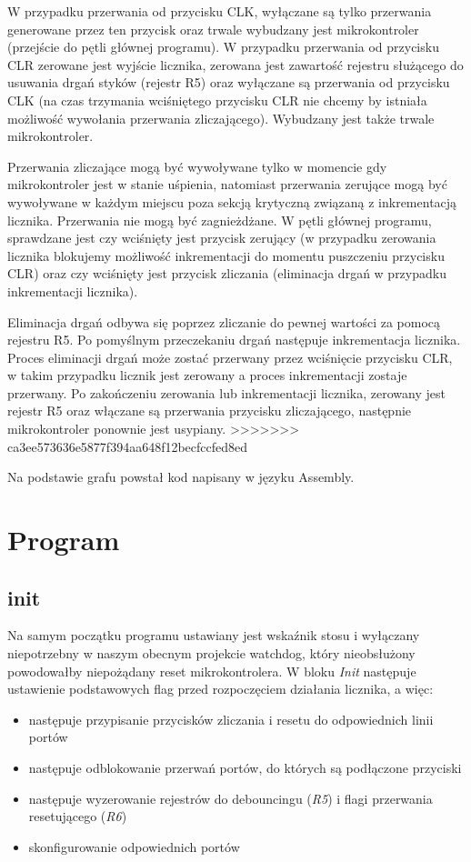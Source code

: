 \documentclass[fleqn]{article}
\begin{document}
W przypadku przerwania od przycisku CLK, wyłączane są tylko przerwania generowane przez ten przycisk oraz trwale wybudzany jest mikrokontroler (przejście do pętli głównej programu). W przypadku przerwania od przycisku CLR zerowane jest wyjście licznika, zerowana jest zawartość rejestru służącego do usuwania drgań styków (rejestr R5) oraz wyłączane są przerwania od przycisku CLK (na czas trzymania wciśniętego przycisku CLR nie chcemy by istniała możliwość wywołania przerwania zliczającego). Wybudzany jest także trwale mikrokontroler.

Przerwania zliczające mogą być wywoływane tylko w momencie gdy mikrokontroler jest w stanie uśpienia, natomiast przerwania zerujące mogą być wywoływane w każdym miejscu poza sekcją krytyczną związaną z inkrementacją licznika. Przerwania nie mogą być zagnieżdżane. W pętli głównej programu, sprawdzane jest czy wciśnięty jest przycisk zerujący (w przypadku zerowania licznika blokujemy możliwość inkrementacji do momentu puszczeniu przycisku CLR) oraz czy wciśnięty jest przycisk zliczania (eliminacja drgań w przypadku inkrementacji licznika).

Eliminacja drgań odbywa się poprzez zliczanie do pewnej wartości za pomocą rejestru R5. Po pomyślnym przeczekaniu drgań następuje inkrementacja licznika. Proces eliminacji drgań może zostać przerwany przez wciśnięcie przycisku CLR, w takim przypadku licznik jest zerowany a proces inkrementacji zostaje przerwany. Po zakończeniu zerowania lub inkrementacji licznika, zerowany jest rejestr R5 oraz włączane są przerwania przycisku zliczającego, następnie mikrokontroler ponownie jest usypiany.
>>>>>>> ca3ee573636e5877f394aa648f12becfccfed8ed

Na podstawie grafu powstał kod napisany w języku Assembly.

\pagebreak

\section{Program}
\subsection{init}

		Na samym początku programu ustawiany jest wskaźnik stosu i wyłączany niepotrzebny w naszym obecnym projekcie watchdog, który nieobsłużony powodowałby niepożądany reset mikrokontrolera.
		W bloku \textit{Init} następuje ustawienie podstawowych flag przed rozpoczęciem działania licznika, a więc:
		\begin{itemize}
			\item następuje przypisanie przycisków zliczania i resetu do odpowiednich linii portów
			\item następuje odblokowanie przerwań portów, do których są podłączone przyciski
			\item następuje wyzerowanie rejestrów do debouncingu (\textit{R5}) i flagi przerwania resetującego (\textit{R6})
			\item skonfigurowanie odpowiednich portów
		\end{itemize}
\end{document}
